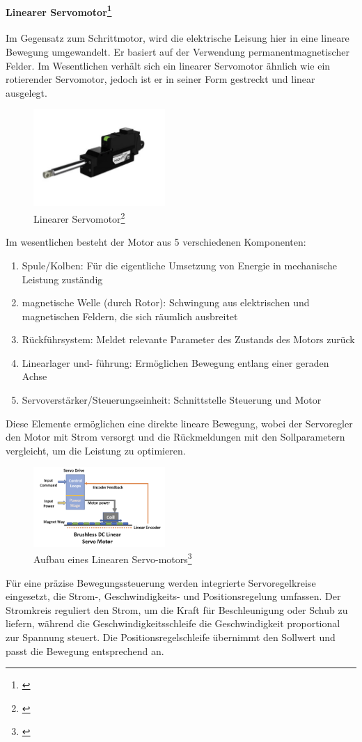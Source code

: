 \paragraph{Linearer Servomotor\footnote{\cite*[siehe ][]{Linearer.Servo}}}
Im Gegensatz zum Schrittmotor, wird die elektrische Leisung hier in eine lineare Bewegung umgewandelt. Er basiert auf der
Verwendung permanentmagnetischer Felder. Im Wesentlichen
verhält sich ein linearer Servomotor ähnlich wie ein rotierender Servomotor, jedoch ist er in seiner Form gestreckt und
linear ausgelegt.
\begin{figure}[htbp]
	\centering
	\includegraphics[width=5cm]{img/LinServo}
	\caption{Linearer Servomotor\footnote{\cite*[siehe ][]{ReicheltLinearerServomotor}}}
	\label{fig:Servomotor}
\end{figure}
Im wesentlichen besteht der Motor aus 5 verschiedenen Komponenten:
\begin{enumerate}
	\item Spule/Kolben: Für die eigentliche Umsetzung von Energie in mechanische Leistung zuständig
	\item magnetische Welle (durch Rotor): Schwingung aus elektrischen und magnetischen Feldern, die sich räumlich ausbreitet
	\item Rückführsystem: Meldet relevante Parameter des Zustands des Motors zurück
	\item Linearlager und- führung: Ermöglichen Bewegung entlang einer geraden Achse
	\item Servoverstärker/Steuerungseinheit: Schnittstelle Steuerung und Motor
\end{enumerate}
Diese Elemente ermöglichen eine direkte lineare Bewegung,
wobei der Servoregler den Motor mit Strom versorgt und die Rückmeldungen mit den Sollparametern vergleicht,
um die Leistung zu optimieren.

\begin{figure}[htbp]
	\centering
	\includegraphics[width=5cm]{img/BrushlessDCLin}
	\caption{Aufbau eines Linearen Servo-motors\footnote{\cite*[siehe ][]{Linearer.Servo}}}
	\label{fig:ServomotorAufbau}
\end{figure}
Für eine präzise Bewegungssteuerung werden integrierte Servoregelkreise eingesetzt, die Strom-, Geschwindigkeits- und
Positionsregelung umfassen. Der Stromkreis reguliert den Strom, um die Kraft für Beschleunigung oder Schub zu liefern,
während die Geschwindigkeitsschleife die Geschwindigkeit proportional zur Spannung steuert. Die Positionsregelschleife
übernimmt den Sollwert und passt die Bewegung entsprechend an.

